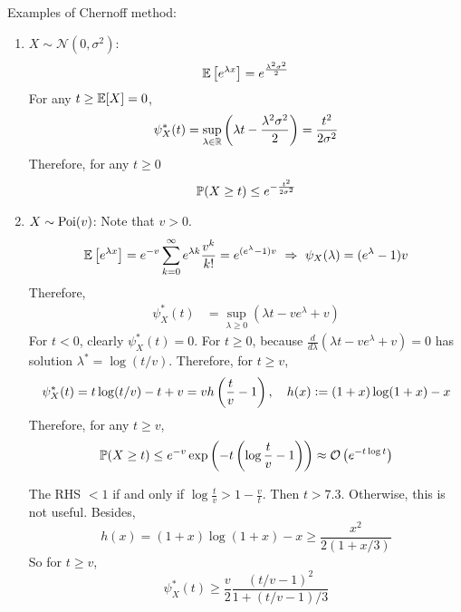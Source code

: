 \begin{enumerate}[label=\arabic{*}.]
	\begin{exam}
	    Examples of Chernoff method:
	    \begin{enumerate}[label=(\arabic{*})]
	    	\item $X \sim \mathcal{N}(0,\sigma^2)$:
	    	\begin{equation*}
	    		\mathbb{E}\left[e^{\lambda x}\right] = e^{\frac{\lambda^2\sigma^2}{2}}
	    	\end{equation*}
	    	For any $t \geq \mathbb{E}[X] = 0$,
	    	\begin{equation*}
	    		\psi_X^*(t) = \sup_{\lambda \in \mathbb{R}} \left(\lambda t - \frac{\lambda^2\sigma^2}{2}\right) = \frac{t^2}{2\sigma^2}
	    	\end{equation*}
	    	Therefore, for any $t \geq 0$
	    	\begin{equation*}
	    		\mathbb{P}(X \geq t) \leq e^{-\frac{t^2}{2\sigma^2}}
	    	\end{equation*}

	    	\item $X \sim \operatorname{Poi}(v)$: Note that $v > 0$.
	    	\begin{equation*}
	    		\mathbb{E}\left[e^{\lambda x}\right] = e^{-v} \sum_{k=0}^\infty e^{\lambda k}\frac{v^k}{k!} = e^{(e^\lambda -1)v}~\Rightarrow~ \psi_X(\lambda) = (e^\lambda -1)v
	    	\end{equation*}
	    	Therefore, 
	    	\begin{equation*}
	    		\begin{aligned}
	    			\psi_X^*(t) &= \sup_{\lambda \geq 0} (\lambda t - ve^\lambda + v)
	    		\end{aligned}
	    	\end{equation*}
	    	For $t < 0$, clearly $\psi_X^*(t) = 0$. For $t \geq 0$, because $\frac{d}{d\lambda}(\lambda t - ve^\lambda + v) = 0$ has solution $\lambda^* = \log(t / v)$. Therefore, for $t \geq v$,
	    	\begin{equation*}
	    		\psi_X^*(t) = t\log(t / v) - t + v = vh\left(\frac{t}{v} - 1\right),\quad h(x) \vcentcolon= (1+x)\log (1+ x) - x
	    	\end{equation*}
	    	Therefore, for any $t \geq v$,
	    	\begin{equation*}
	    		\mathbb{P}(X \geq t) \leq e^{-v}\exp\left(-t\left(\log\frac{t}{v} - 1\right)\right) \approx \mathcal{O}\left(e^{-t\log t}\right)
	    	\end{equation*}
	    	\begin{rmk}
	    	    The RHS $< 1$ if and only if $\log \frac{t}{v} > 1 - \frac{v}{t}$. Then $t > 7.3$. Otherwise, this is not useful. Besides,
	    	    \begin{equation*}
	    	         h(x) = (1+x)\log (1+ x) - x \geq \frac{x^2}{2(1+x/3)}
	    	    \end{equation*}
	    	    So for $t \geq v$,
	    	    \begin{equation*}
	    	    	\psi_X^*(t) \geq \frac{v}{2}\frac{(t/v - 1)^2}{1 + (t /v-1)/3}
	    	    \end{equation*}
	    	\end{rmk}


\end{enumerate}
\end{exam}
\end{enumerate}
